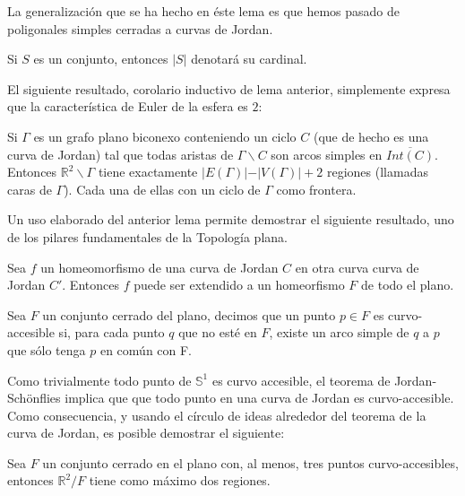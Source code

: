 \documentclass[12pt,a4paper,oldfontcommands]{memoir}
\begin{document}
	La generalización que se ha hecho en éste lema es que hemos pasado de poligonales simples cerradas a curvas de Jordan.
	
	\begin{definition}
Si $S$ es un conjunto, entonces $\vert S \vert$ denotará su cardinal.
\end{definition}
El siguiente resultado, corolario inductivo de lema anterior, simplemente expresa que la característica de Euler de la esfera es $2$:
\begin{lemma}
	Si $\Gamma$ es un grafo plano biconexo conteniendo un ciclo $C$ (que de hecho es una curva de Jordan) tal que todas aristas de $\Gamma \backslash C$ son arcos simples en $\overline{Int(C)}$. Entonces $\mathbb{R}^2 \backslash \Gamma$ tiene exactamente $\vert E(\Gamma) \vert - \vert V(\Gamma) \vert + 2$ regiones (llamadas caras de $\Gamma$). Cada una de ellas con un ciclo de $\Gamma$ como frontera.
\end{lemma}

Un uso elaborado del anterior lema  permite demostrar el siguiente resultado, uno de los pilares fundamentales de la Topología plana.

\begin{theorem}
	Sea $f$ un homeomorfismo de una curva de Jordan $C$ en otra curva curva de Jordan $C'$. Entonces $f$ puede ser extendido a un homeorfismo $F$ de todo el plano.
\end{theorem}
 

\begin{definition}
	Sea $F$ un conjunto cerrado del plano, decimos que un punto $p \in F$ es curvo-accesible si, para cada punto $q$ que no esté en $F$, existe un arco simple de $q$ a $p$ que sólo tenga $p$ en común con F.
\end{definition}

Como trivialmente todo punto de $\mathbb{S}^1$ es curvo accesible, el teorema de Jordan-Schönflies implica que que todo punto en una curva de Jordan es curvo-accesible. Como consecuencia, y usando el círculo de ideas alrededor del teorema de la curva de Jordan, es posible demostrar el siguiente:

\begin{theorem}
	Sea $F$ un conjunto cerrado en el plano con, al menos, tres puntos curvo-accesibles, entonces $\mathbb{R}^2 / F$ tiene como máximo dos regiones.
\end{theorem}
\end{document}
